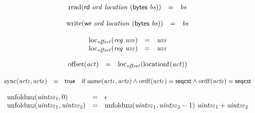 $$
\begin{array}[t]{@{}lcl@{}l@{}}
{\mathrm{read}}(\mathsf{rd}~{\mathit{ord}}~{\mathit{location}}~(\mathsf{bytes}~{\mathit{bs}})) & = & {\mathit{bs}} \\
\end{array}
$$

$$
\begin{array}[t]{@{}lcl@{}l@{}}
{\mathrm{write}}(\mathsf{wr}~{\mathit{ord}}~{\mathit{location}}~(\mathsf{bytes}~{\mathit{bs}})) & = & {\mathit{bs}} \\
\end{array}
$$

$$
\begin{array}[t]{@{}lcl@{}l@{}}
{\mathrm{loc}}_{\mathit{offset}}({\mathit{reg}}~{\mathit{u{\kern-0.1em\scriptstyle 32}}}) & = & {\mathit{u{\kern-0.1em\scriptstyle 32}}} \\
{\mathrm{loc}}_{\mathit{offset}}({\mathit{reg}}~{\mathit{u{\kern-0.1em\scriptstyle 32}}}) & = & {\mathit{u{\kern-0.1em\scriptstyle 32}}} \\
\end{array}
$$

$$
\begin{array}[t]{@{}lcl@{}l@{}}
{\mathrm{offset}}({\mathit{act}}) & = & {\mathrm{loc}}_{\mathit{offset}}({\mathrm{locationf}}({\mathit{act}})) \\
\end{array}
$$

$$
\begin{array}[t]{@{}lcl@{}l@{}}
{\mathrm{sync}}({\mathit{act{\kern-0.1em\scriptstyle 1}}}, {\mathit{act{\kern-0.1em\scriptstyle 2}}}) & = & \mathsf{true} & \quad \mbox{if}~ {\mathrm{same}}({\mathit{act{\kern-0.1em\scriptstyle 1}}}, {\mathit{act{\kern-0.1em\scriptstyle 2}}}) \land {\mathrm{ordf}}({\mathit{act{\kern-0.1em\scriptstyle 1}}}) = \mathsf{seqcst} \land {\mathrm{ordf}}({\mathit{act{\kern-0.1em\scriptstyle 2}}}) = \mathsf{seqcst} \\
\end{array}
$$

$$
\begin{array}[t]{@{}lcl@{}l@{}}
{\mathrm{unfoldu{\kern-0.1em\scriptstyle 32}}}({\mathit{uint{\kern-0.1em\scriptstyle 32}}}_1, 0) & = & \epsilon \\
{\mathrm{unfoldu{\kern-0.1em\scriptstyle 32}}}({\mathit{uint{\kern-0.1em\scriptstyle 32}}}_1, {\mathit{uint{\kern-0.1em\scriptstyle 32}}}_2) & = & {\mathrm{unfoldu{\kern-0.1em\scriptstyle 32}}}({\mathit{uint{\kern-0.1em\scriptstyle 32}}}_1, {\mathit{uint{\kern-0.1em\scriptstyle 32}}}_2 - 1)~{\mathit{uint{\kern-0.1em\scriptstyle 32}}}_1 + {\mathit{uint{\kern-0.1em\scriptstyle 32}}}_2 \\
\end{array}
$$

